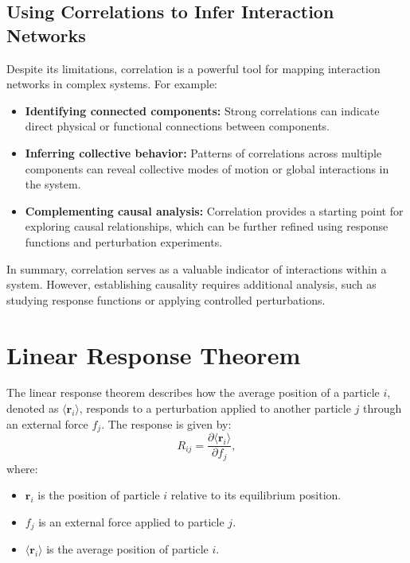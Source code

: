\documentclass[English, Lau, oneside]{sapthesis}
\begin{document}
\subsection*{Using Correlations to Infer Interaction Networks}

\noindent Despite its limitations, correlation is a powerful tool for mapping interaction networks in complex systems. For example:
\begin{itemize}
    \item \textbf{Identifying connected components:} Strong correlations can indicate direct physical or functional connections between components.
    \item \textbf{Inferring collective behavior:} Patterns of correlations across multiple components can reveal collective modes of motion or global interactions in the system.
    \item \textbf{Complementing causal analysis:} Correlation provides a starting point for exploring causal relationships, which can be further refined using response functions and perturbation experiments.
\end{itemize}

In summary, correlation serves as a valuable indicator of interactions within a system. However, establishing causality requires additional analysis, such as studying response functions or applying controlled perturbations.
\section{Linear Response Theorem}

\noindent The linear response theorem describes how the average position of a particle $i$, denoted as $\langle \mathbf{r}_i \rangle$, responds to a perturbation applied to another particle $j$ through an external force $f_j$. The response is given by:
\begin{equation}
R_{ij} = \frac{\partial \langle \mathbf{r}_i \rangle}{\partial f_j},
\end{equation}
where:
\begin{itemize}
    \item $\mathbf{r}_i$ is the position of particle $i$ relative to its equilibrium position.
    \item $f_j$ is an external force applied to particle $j$.
    \item $\langle \mathbf{r}_i \rangle$ is the average position of particle $i$.
\end{itemize}
\end{document}
